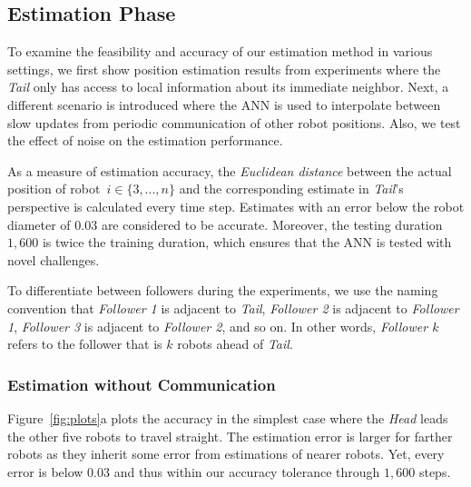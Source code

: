 \documentclass[letterpaper, 10 pt, conference]{ieeeconf}  %
\begin{document}
	
	\subsection{Estimation Phase}
	\label{sec:estimationphase}
	
	To examine the feasibility and accuracy of our estimation method in various
	settings, we first show position estimation results from experiments
	where the \emph{Tail} only has access to local information about its
	immediate neighbor. Next, a different scenario is introduced where the
	ANN is used to interpolate between slow updates from periodic
	communication of other robot positions. Also, we test the effect of
	noise on the estimation performance.
	
	As a measure of estimation accuracy, the \emph{Euclidean distance}
	between the actual position of robot~$i \in \{3, ..., n\}$ and the
	corresponding estimate in \emph{Tail}'s perspective is calculated every
	time step. Estimates with an error below the robot diameter of $0.03$
	are considered to be accurate. Moreover, the testing duration $1,600$ is
	twice the training duration, which ensures that the ANN is tested with
	novel challenges.
	
	To differentiate between followers during the experiments, we use the
	naming convention that \emph{Follower 1} is adjacent to \emph{Tail},
	\emph{Follower 2} is adjacent to \emph{Follower 1}, \emph{Follower 3} is
	adjacent to \emph{Follower 2}, and so on. In other words, \emph{Follower
		$k$} refers to the follower that is $k$ robots ahead of \emph{Tail}.
	
	\subsubsection{Estimation without Communication}
	\label{sec:estwithoutcomm}
	
	Figure~\ref{fig:plots}a plots the accuracy in the simplest
	case where the \emph{Head} leads the other five robots to travel straight.
	The estimation error is larger for farther robots as they inherit some
	error from estimations of nearer robots. Yet, every error is below
	$0.03$ and thus within our accuracy tolerance through $1,600$ steps.
	
\end{document}
